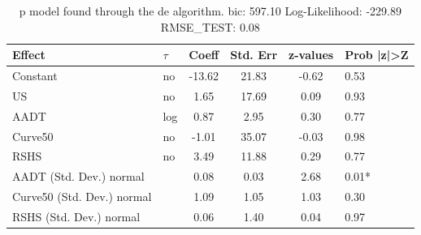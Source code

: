 \begin{table}
	\caption{p model found through the de algorithm. bic: 597.10 Log-Likelihood: -229.89 RMSE_TEST: 0.08}
	\begin{center}
		\begin{tabular}{|l|l|c|c|c|l|}
			\hline
			Effect & $\tau$ & Coeff & Std. Err & z-values & Prob |z|>Z \\
			\hline
			Constant & no & -13.62 & 21.83 & -0.62 & 0.53 \\
			\hline
			US & no & 1.65 & 17.69 & 0.09 & 0.93 \\
			\hline
			AADT & log & 0.87 & 2.95 & 0.30 & 0.77 \\
			\hline
			Curve50 & no & -1.01 & 35.07 & -0.03 & 0.98 \\
			\hline
			RSHS & no & 3.49 & 11.88 & 0.29 & 0.77 \\
			\hline
			AADT (Std. Dev.) normal &  & 0.08 & 0.03 & 2.68 & 0.01* \\
			\hline
			Curve50 (Std. Dev.) normal &  & 1.09 & 1.05 & 1.03 & 0.30 \\
			\hline
			RSHS (Std. Dev.) normal &  & 0.06 & 1.40 & 0.04 & 0.97 \\
			\hline
		\end{tabular}
	\end{center}
\end{table}